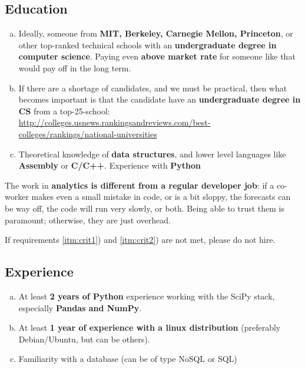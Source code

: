 \documentclass[12pt]{article}
\begin{document}
\subsection{Education}
\begin{enumerate}[a)]
	\item
		Ideally, someone from \textbf{MIT, Berkeley, Carnegie Mellon, Princeton}, or other
		top-ranked technical schools with an \textbf{undergraduate degree in
		computer science}. 
		Paying even \textbf{above market rate} for someone like that would pay off in the
		long term. 
	\item\label{itm:crit1} If there are a shortage of candidates, and we must be practical, then
		what becomes important is that the candidate have an \textbf{undergraduate
		degree in CS} from a top-25-school: \\
		\href{}{http://colleges.usnews.rankingsandreviews.com/best-colleges/rankings/national-universities}
	\item\label{itm:crit2} Theoretical knowledge of \textbf{data structures}, and lower level languages like
		\textbf{Assembly} or \textbf{C/C++}. Experience with \textbf{Python}

\end{enumerate}

The work in \textbf{analytics is different from a regular developer
job}: if a co-worker makes even a small mistake in code, or is a bit sloppy,
the forecasts can be way off, the code will run very slowly, or both. Being able to trust them is paramount; otherwise, they are just overhead.


\begin{framed}
	If requirements \ref{itm:crit1}) and \ref{itm:crit2}) are not met, please do not hire.
\end{framed}

\subsection{Experience}
\begin{enumerate}[a)]
	\item\label{itm:exp1}At least \textbf{2 years of Python} experience working with the SciPy stack,
		especially \textbf{Pandas and NumPy}.
	\item\label{itm:exp2}
		At least \textbf{1 year of experience with a linux distribution} (preferably
		Debian/Ubuntu, but can be others). 
	\item\label{itm:exp3} Familiarity with a database (can be of type NoSQL or SQL)
\end{enumerate}
\end{document}
